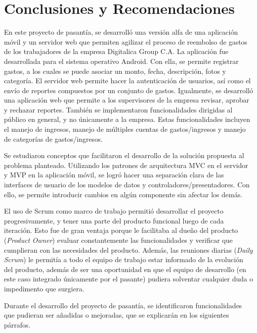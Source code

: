 \chapter{Conclusiones y Recomendaciones} \label{chap:conclusiones}

En este proyecto de pasantía, se desarrolló una versión alfa de una aplicación móvil y un servidor web que permiten agilizar el proceso de reembolso de gastos de los trabajadores de la empresa Digitalica Group C.A. La aplicación fue desarrollada para el sistema operativo Android. Con ella, se permite registrar gastos, a los cuales se puede asociar un monto, fecha, descripción, fotos y categoría. El servidor web permite hacer la autenticación de usuarios, así como el envío de reportes compuestos por un conjunto de gastos. Igualmente, se desarrolló una aplicación web que permite a los supervisores de la empresa revisar, aprobar y rechazar reportes. También se implementaron funcionalidades dirigidas al público en general, y no únicamente a la empresa. Estas funcionalidades incluyen el manejo de ingresos, manejo de múltiples cuentas de gastos/ingresos y manejo de categorías de gastos/ingresos.

Se estudiaron conceptos que facilitaron el desarrollo de la solución propuesta al problema planteado. Utilizando los patrones de arquitectura MVC en el servidor y MVP en la aplicación móvil, se logró hacer una separación clara de las interfaces de usuario de los modelos de datos y controladores/presentadores. Con ello, se permite introducir cambios en algún componente sin afectar los demás.


El uso de Scrum como marco de trabajo permitió desarrollar el proyecto progresivamente, y tener una parte del producto funcional luego de cada iteración. Esto fue de gran ventaja porque le facilitaba al dueño del producto (\textit{Product Owner}) evaluar constantemente las funcionalidades y verificar que cumplieran con las necesidades del producto. Además, las reuniones diarias (\textit{Daily Scrum}) le permitía a todo el equipo de trabajo estar informado de la evolución del producto, además de ser una oportunidad en que el equipo de desarrollo (en este caso integrado únicamente por el pasante) pudiera solventar cualquier duda o impedimento que surgiera.

Durante el desarrollo del proyecto de pasantía, se identificaron funcionalidades que pudieran ser añadidas o mejoradas, que se explicarán en los siguientes párrafos.

